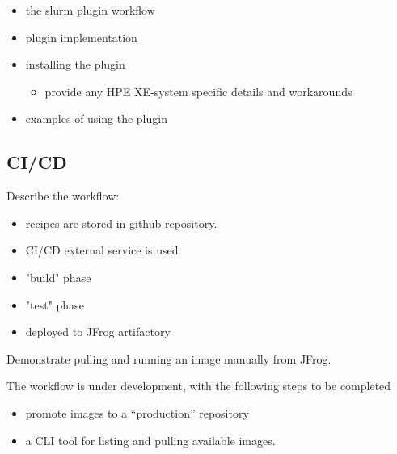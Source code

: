 \begin{itemize}
    \item the slurm plugin workflow
    \item plugin implementation
    \item installing the plugin
    \begin{itemize}
        \item provide any HPE XE-system specific details and workarounds
    \end{itemize}
    \item examples of using the plugin
\end{itemize}

\subsection{CI/CD}


Describe the workflow:
\begin{itemize}
    \item recipes are stored in \href{https://github.com/eth-cscs/alps-spack-stacks}{github repository}.
    \item CI/CD external service is used
    \item "build" phase
    \item "test" phase
    \item deployed to JFrog artifactory
\end{itemize}

Demonstrate pulling and running an image manually from JFrog.

The workflow is under development, with the following steps to be completed
\begin{itemize}
    \item promote images to a ``production'' repository
    \item a CLI tool for listing and pulling available images.
\end{itemize}

